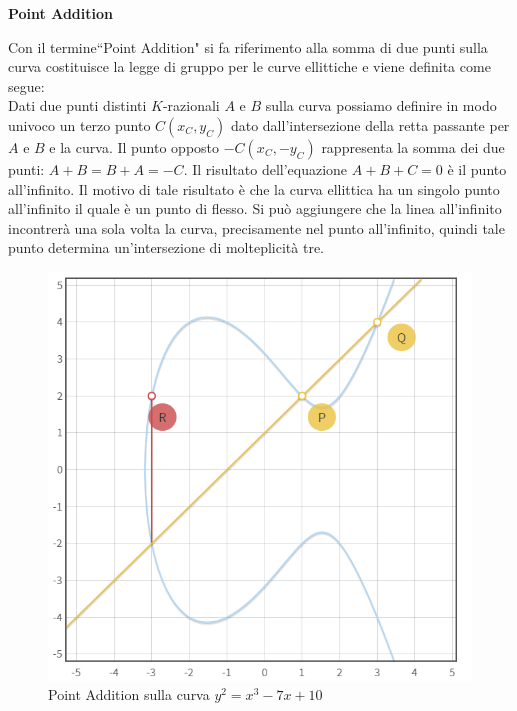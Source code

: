 \documentclass[a4paper,12pt]{tesiinfo}
\begin{document}
\begin{center}
\textbf{Point Addition}
\end{center}
Con il termine``Point Addition" si fa riferimento alla somma di due punti sulla curva costituisce la legge di gruppo per le curve ellittiche e viene definita come segue: 
\\
Dati due punti distinti $K$-razionali $A$ e $B$ sulla curva possiamo definire in modo univoco un terzo punto $C(x_C, y_C)$ dato dall'intersezione della retta passante per $A$ e $B$ e la curva. Il punto opposto $-C(x_C, -y_C)$ rappresenta la somma dei due punti: $A + B = B+ A = -C$. Il risultato dell'equazione $A+B+C = 0$ \`e il punto all'infinito. Il motivo di tale risultato \`e che la curva ellittica ha un singolo punto all'infinito il quale \`e un punto di flesso. Si pu\`o aggiungere che la linea all'infinito incontrer\`a una sola volta la curva, precisamente nel punto all'infinito, quindi tale punto determina un'intersezione di molteplicit\`a tre.
\begin{figure}[H]
    \includegraphics[width=.75\textwidth,center]{PA_P+Q}
    \caption{Point Addition sulla curva $y^2 = x^3-7x+10$}
\end{figure}
\end{document}
